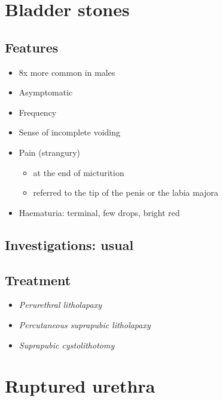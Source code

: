 \documentclass[
  14pt,
]{memoir}
\providecommand{\tightlist}{%
  \setlength{\itemsep}{0pt}\setlength{\parskip}{0pt}}
\begin{document}
\pagebreak

\hypertarget{bladder-stones}{%
\section{Bladder stones}\label{bladder-stones}}

\hypertarget{features-5}{%
\subsection{Features}\label{features-5}}

\begin{itemize}
\tightlist
\item
  8x more common in males
\item
  Asymptomatic
\item
  Frequency
\item
  Sense of incomplete voiding
\item
  Pain (strangury)

  \begin{itemize}
  \tightlist
  \item
    at the end of micturition
  \item
    referred to the tip of the penis or the labia majora
  \end{itemize}
\item
  Haematuria: terminal, few drops, bright red
\end{itemize}

\hypertarget{investigations-usual}{%
\subsection{Investigations: usual}\label{investigations-usual}}

\hypertarget{treatment-5}{%
\subsection{Treatment}\label{treatment-5}}

\begin{itemize}
\item
  \emph{Perurethral litholapaxy}
\item
  \emph{Percutaneous suprapubic litholapaxy}
\item
  \emph{Suprapubic cystolithotomy}
\end{itemize}

\pagebreak

\hypertarget{ruptured-urethra}{%
\section{Ruptured urethra}\label{ruptured-urethra}}
\end{document}
